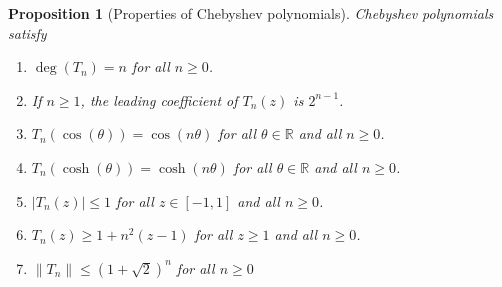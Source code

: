 \documentclass[12pt]{article}
\newtheorem{proposition}[definition]{Proposition}
\newcommand{\R}{\mathbb{R}}  %
\newcommand{\norm}[1]{\left\| #1 \right\|}  %
\begin{document}
\begin{proposition}[Properties of Chebyshev polynomials]
\label{proposition:properties-of-chebyshev-polynomials}
Chebyshev polynomials satisfy
\begin{enumerate}
\item $\deg(T_n) = n$ for all $n \ge 0$.
\item If $n \ge 1$, the leading coefficient of $T_n(z)$ is $2^{n-1}$.
\item $T_n(\cos(\theta)) = \cos(n \theta)$ for all $\theta \in \R$ and all $n \ge 0$.
\item $T_n(\cosh(\theta)) = \cosh(n \theta)$ for all $\theta \in \R$ and all $n \ge 0$.
\item $|T_n(z)| \le 1$ for all $z \in [-1,1]$ and all $n \ge 0$.
\item $T_n(z) \ge 1 + n^2(z - 1)$ for all $z \ge 1$ and all $n \ge 0$.
\item $\norm{T_n} \le (1+\sqrt{2})^n$ for all $n \ge 0$
\end{enumerate}
\end{proposition}
\end{document}
